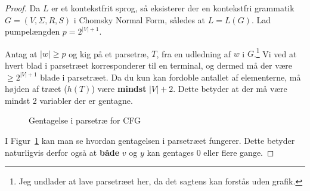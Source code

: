 \begin{proof}
  Da $L$ er et kontekstfrit sprog, så eksisterer der en kontekstfri grammatik $G = (V, \Sigma, R, S)$ i Chomsky Normal Form, således at $L = L(G)$. Lad pumpelængden $p = 2^{|V| + 1}$.

  Antag at $|w| \ge p$ og kig på et parsetræ, $T$, fra en udledning af $w$ i  $G$.\footnote{Jeg undlader at lave parsetræet her, da det sagtens kan forstås uden grafik.} Vi ved at hvert blad i parsetræet korresponderer til en terminal, og dermed må der være $\ge 2^{|V| +1}$ blade i parsetræet. Da du kun kan fordoble antallet af elementerne, må højden af træet ($h(T)$) være \textbf{mindst} $|V| + 2$. Dette betyder at der må være mindst 2 variabler der er gentagne.

\begin{figure}[ht]
  \centering
{}
  \caption{\label{fig:pumpelemmacfg} Gentagelse i parsetræ for CFG}
\end{figure}

I Figur~\ref{fig:pumpelemmacfg} kan man se hvordan gentagelsen i parsetræet fungerer. Dette betyder naturligvis derfor også at \textbf{både} $v$ og $y$ kan gentages 0 eller flere gange.
\end{proof}







